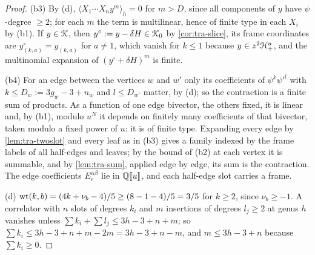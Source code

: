 \begin{proof}
(b3) By (d), $\langle X_1\cdots X_ny^m\rangle_h = 0$ for $m>D$, since all components of $y$ have $\psi$-degree $\geq 2$; for each $m$ the term is multilinear, hence of finite type in each $X_i$ by (b1). If $y\in\mathcal{K}$, then $y^\circ := y-\delta H\in\mathcal{K}_{0}$ by \cref{cor:tra-slice}, its frame coordinates are $y^\circ_{(k,a)} = y_{(k,a)}$ for $a\neq 1$, which vanish for $k\leq 1$ because $y\in z^2\mathcal{H}^u_+$, and the multinomial expansion of $(y^\circ+\delta H)^m$ is finite.

(b4) For an edge between the vertices $w$ and $w'$ only its coefficients of $\psi^k\psi'^l$ with $k\leq D_w := 3g_w-3+n_w$ and $l\leq D_{w'}$ matter, by (d); so the contraction is a finite sum of products. As a function of one edge bivector, the others fixed, it is linear and, by (b1), modulo $u^N$ it depends on finitely many coefficients of that bivector, taken modulo a fixed power of $u$: it is of finite type. Expanding every edge by \cref{lem:tra-twoslot} and every leaf as in (b3) gives a family indexed by the frame labels of all half-edges and leaves; by the bound of (b2) at each vertex it is summable, and by \cref{lem:tra-sum}, applied edge by edge, its sum is the contraction. The edge coefficients $E^{\alpha\beta}_e$ lie in $\mathbb{Q}[\![ u ]\!]$, and each half-edge slot carries a frame.

(d) $\operatorname{wt}(k,b) = (4k+\nu_b-4)/5\geq(8-1-4)/5 = 3/5$ for $k\geq 2$, since $\nu_b\geq -1$. A correlator with $n$ slots of degrees $k_i$ and $m$ insertions of degrees $l_j\geq 2$ at genus $h$ vanishes unless $\sum k_i+\sum l_j\leq 3h-3+n+m$; so $\sum k_i\leq 3h-3+n+m-2m = 3h-3+n-m$, and $m\leq 3h-3+n$ because $\sum k_i\geq 0$.


\end{proof}
